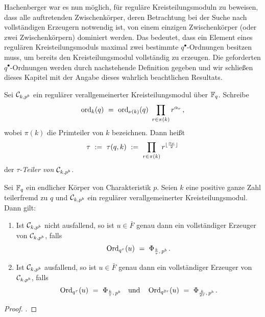 Hachenberger war es nun möglich, für reguläre Kreisteilungsmoduln zu beweisen,
dass alle auftretenden Zwischenkörper, deren Betrachtung bei der Suche nach
vollständigen Erzeugern notwendig ist, von einem einzigen 
Zwischenkörper (oder zwei Zwischenkörpern) dominiert werden. Das bedeutet, dass
ein Element eines regulären Kreisteilungsmoduls maximal zwei bestimmte
$q^\bullet$-Ordnungen besitzen muss, um bereits den Kreisteilungsmodul
vollständig zu erzeugen. Die
geforderten $q^\bullet$-Ordnungen werden durch nachstehende Definition gegeben
und wir schließen dieses Kapitel mit der Angabe dieses wahrlich beachtlichen
Resultats.

\begin{definition}
  \label{def:tau}
  Sei $\mathcal{C}_{k,p^b}$ ein regulärer verallgemeinerter Kreisteilungsmodul über
  $\mathbb{F}_q$. Schreibe
  \[ \operatorname{ord}_k(q) \ =\  \operatorname{ord}_{\nu(k)}(q) \ \prod_{r \in \pi(k)} r^{\alpha_r}\,,\]
  wobei $\pi(k)$ die Primteiler von $k$ bezeichnen.
  Dann heißt
  \[ \tau \ :=\  \tau(q,k) \ :=\  \prod_{r\in \pi(k)} 
    r^{\lfloor \frac{\alpha_r}{2}\rfloor}\]
  der \emph{$\tau$-Teiler von $\mathcal{C}_{k,p^b}$}.
\end{definition}

\begin{satz}
  \label{satz:regulare_erweiterungen}
  Sei $\mathbb{F}_q$ ein endlicher Körper von Charakteristik $p$. 
  Seien $k$ eine positive ganze Zahl teilerfremd zu $q$ und 
  $\mathcal{C}_{k,p^b}$ ein regulärer verallgemeinerter Kreisteilungsmodul. Dann gilt:
  \begin{enumerate}
    \item Ist $\mathcal{C}_{k,p^b}$ nicht ausfallend, so ist $u \in \bar F$ genau dann
      ein vollständiger Erzeuger von $\mathcal{C}_{k,p^b}$, falls
      \[ \operatorname{Ord}_{q^\tau}(u) \ =\  \Phi_{\frac k \tau,\, p^b} \,.\]
    \item Ist $\mathcal{C}_{k,p^b}$ ausfallend, so ist $u\in \bar F$ genau dann
      ein vollständiger Erzeuger von $\mathcal{C}_{k,p^b}$, falls
      \[ \operatorname{Ord}_{q^\tau}(u) \ =\  \Phi_{\frac k \tau,\, p^b} \quad
        \text{und}\quad 
        \operatorname{Ord}_{q^{2\tau}}(u) \ =\  \Phi_{\frac{k}{2\tau},\, p^b}\,.\]
  \end{enumerate}
\end{satz}
\begin{proof}
  \autocite[Theorem 20.3]{hachenberger1997finite}.
\end{proof}
